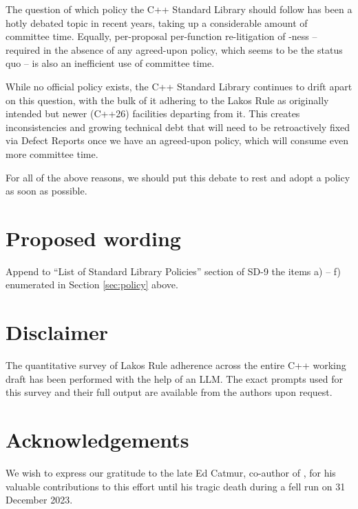 The question of which  policy the C++ Standard Library should follow has been a hotly debated topic in recent years, taking up a considerable amount of committee time. Equally, per-proposal per-function re-litigation of -ness -- required in the absence of any agreed-upon policy, which seems to be the status quo -- is also an inefficient use of committee time.

While no official policy exists, the C++ Standard Library continues to drift apart on this question, with the bulk of it adhering to the Lakos Rule as originally intended but newer (C++26) facilities departing from it. This creates inconsistencies and growing technical debt that will need to be retroactively fixed via Defect Reports once we have an agreed-upon policy, which will consume even more committee time.

For all of the above reasons, we should put this debate to rest and adopt a  policy as soon as possible. 


\section{Proposed wording}
\label{sec:wording}

Append to ``List of Standard Library Policies'' section of SD-9 the items a) -- f) enumerated in Section \ref{sec:policy} above.



\section*{Disclaimer}
The quantitative survey of Lakos Rule adherence across the entire C++ working draft has been performed with the help of an LLM. The exact prompts used for this survey and their full output are available from the authors upon request.

\section*{Acknowledgements}
We wish to express our gratitude to the late Ed Catmur, co-author of \cite{P2831R0}, for his valuable contributions to this effort until his tragic death during a fell run on 31 December 2023.


\renewcommand{\bibname}{References}





